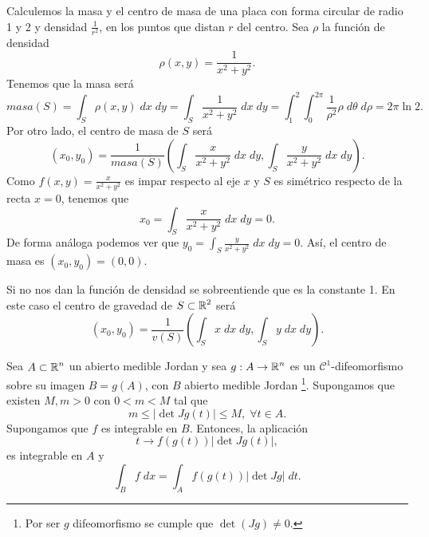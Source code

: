 \begin{eg}
Calculemos la masa y el centro de masa de una placa con forma circular de radio 1 y 2 y densidad $\displaystyle \frac{1}{r^{2}} $, en los puntos que distan $\displaystyle r $ del centro. Sea $\displaystyle \rho $ la función de densidad
\[\rho\left(x,y\right)=\frac{1}{x^{2}+y^{2}} .\]
Tenemos que la masa será
\[masa\left(S\right) = \int _{S} \rho\left(x,y\right)\; dx \; dy=\int _{S}\frac{1}{x^{2}+y^{2}} \; dx \; dy = \int^{2}_{1} \int^{2\pi }_{0} \frac{1}{\rho^{2}}\rho \; d\theta  \; d\rho = 2\pi \ln 2 .\]
Por otro lado, el centro de masa de $\displaystyle S $ será
\[\left(x_{0}, y_{0}\right)=\frac{1}{masa\left(S\right)}\left(\int _{S}\frac{x}{x^{2}+y^{2}} \; dx \; dy, \int _{S}\frac{y}{x^{2}+y^{2}} \; dx \; dy\right) .\]
Como $\displaystyle f\left(x,y\right)=\frac{x}{x^{2}+y^{2}} $ es impar respecto al eje $\displaystyle x $ y $\displaystyle S $ es simétrico respecto de la recta $\displaystyle x = 0 $, tenemos que 
\[x_{0} = \int _{S}\frac{x}{x^{2}+y^{2}} \; dx \; dy = 0 .\]
De forma análoga podemos ver que $\displaystyle y_{0} = \int _{S}\frac{y}{x^{2}+y^{2}} \; dx \; dy = 0 $. Así, el centro de masa es $\displaystyle \left(x_{0}, y_{0}\right)=\left(0,0\right) $. 
\end{eg}
\begin{observation}
Si no nos dan la función de densidad se sobreentiende que es la constante 1. En este caso el centro de gravedad de $\displaystyle S \subset \mathbb{R}^{2} $ será
\[\left(x_{0}, y_{0}\right)=\frac{1}{v\left(S\right)}\left(\int _{S}x \; dx \; dy, \int _{S}y \; dx \; dy\right) .\]
\end{observation}



\begin{theorem}
Sea $\displaystyle A \subset \mathbb{R}^{n} $ un abierto medible Jordan y sea $\displaystyle g : A \to \mathbb{R}^{n} $ es un $\displaystyle \mathcal{C}^{1} $-difeomorfismo sobre su imagen $\displaystyle B = g\left(A\right) $, con $\displaystyle B $ abierto medible Jordan \footnote{Por ser $\displaystyle g $ difeomorfismo se cumple que $\displaystyle \det\left(Jg\right)\neq 0 $.}. Supongamos que existen $\displaystyle M, m > 0 $ con $\displaystyle 0 < m < M $ tal que 
\[ m \leq \left|\det Jg\left(t\right)\right| \leq M , \; \forall t \in A.\]
Supongamos que $\displaystyle f $ es integrable en $\displaystyle B $. Entonces, la aplicación 
\[t \to f\left(g\left(t\right)\right) \left|\det Jg\left(t\right)\right| ,\]
es integrable en $\displaystyle A $ y 
\[\int _{B}f \; dx = \int _{A}f\left(g\left(t\right)\right) \left|\det Jg\right| \; dt .\]
\end{theorem}


